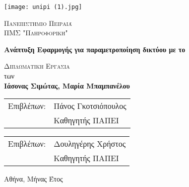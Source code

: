 \begin{titlepage}
    \begin{center}
        \vspace*{-1cm}
        
        \texttt{[image: unipi (1).jpg]}
        
        \Large
        \textsc{Πανεπιστήμιο Πειραιά}\\
        \large
        \textsc{ΠΜΣ "Πληροφορική"}\\
        
        \vspace{2.5cm}
        
        \Huge
        \textbf{Ανάπτυξη Εφαρμογής για παραμετροποίηση δικτύου με το }
        
        \vspace{3cm}
        \Large
        \textsc{Διπλωματικη Εργασια}\\
        των\\

        \LARGE
        \textbf{Ιάσονας Σιμώτας, Μαρία Μπαμπανέλου}
        
    \end{center}
    
    \vspace{3cm}
    
    \begin{tabular}{ll}
		Επιβλέπων: & Πάνος Γκοτσιόπουλος \\
		 & Καθηγητής ΠΑΠΕΙ
	\end{tabular}

    \begin{tabular}{ll}
		Επιβλέπων: & Δουληγέρης Χρήστος \\
		 & Καθηγητής ΠΑΠΕΙ
	\end{tabular}
	
    \vfill
    
    \begin{center}
    	 Αθήνα, Μήνας Έτος	
    \end{center}
\end{titlepage}